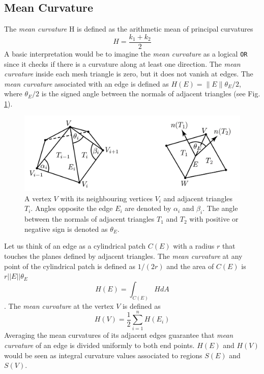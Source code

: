\subsection{Mean Curvature}
The \textit{mean curvature} H is defined as the arithmetic mean of principal curvatures $$H = \frac{k_1 + k_2}{2}$$  A basic interpretation would be to imagine the \textit{mean curvature} as a logical \texttt{OR} since it checks if there is a curvature along at least one direction.\cite{WEBSITE:gaussiancurvaturedirty}
The \textit{mean curvature} inside each mesh triangle is zero, but it does not vanish at edges. The \textit{mean curvature} associated with an edge is defined as $H(E) = \parallel E \parallel {\theta}_E/2$, where ${\theta}_E/2$ is the signed
angle between the normals of adjacent triangles (see Fig. \ref{fig:mean-curvature}).

\begin{figure}[h]
  \centering
\includegraphics[scale=0.4]{images/mean_curvature_paper.png}
\caption{A vertex $V$ with its neighbouring vertices $V_i$ and adjacent triangles $T_i$. Angles opposite the edge $E_i$ are denoted by $\alpha_i$ and $\beta_i$. The
angle between the normals of adjacent triangles $T_1$ and $T_2$ with positive or negative sign is denoted as ${\theta}_E$. \cite{geometryprocessing}}\label{fig:mean-curvature}
\end{figure}
Let us think of an edge as a cylindrical patch $C(E)$ with a radius $r$ that touches the planes defined by adjacent triangles. The \textit{mean curvature} at any point of the cylindrical patch is defined as $1/(2r)$ and the area of $C(E)$ is $r||E||\theta_E$
$$H(E) = \int_{C(E)} HdA$$.
The \textit{mean curvature} at the vertex $V$ is defined as $$H(V) = \frac{1}{2} \sum_{i=1}^n H(E_i)$$ Averaging the mean curvatures of its adjacent edges guarantee that \textit{mean curvature} of an edge is divided uniformly to both end points. $H(E)$ and $H(V)$ would be seen as integral curvature values associated to regions $S(E)$ and $S(V)$.
\cite{geometryprocessing}


